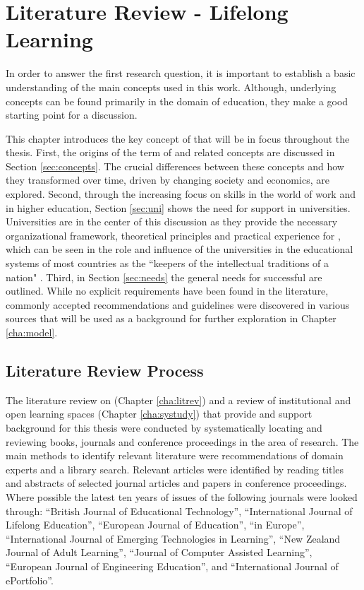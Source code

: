 \chapter{Literature Review - Lifelong Learning \label{cha:litrev}}

In order to answer the first research question, it is important to establish a
basic understanding of the main concepts used in this work. Although,
underlying concepts can be found primarily in the domain of education, they make
a good starting point for a discussion. 

This chapter introduces the key concept of \LLLs that will be in focus
throughout the thesis. First, the origins of the term of \textit{\LLLsn} and
related concepts are discussed in Section \ref{sec:concepts}. The crucial
differences between these concepts and how they transformed over time, driven by
changing society and economics, are explored. Second, through the increasing
focus on \LLLs skills in the world of work and in higher education, Section
\ref{sec:uni} shows the need for \LLLs support in universities. Universities are
in the center of this discussion as they provide the necessary organizational
framework, theoretical principles and practical experience for \LLLs
\citep{Knapper2000}, which can be seen in the role and influence of the
universities in the educational systems of most countries as the ``keepers of
the intellectual traditions of a nation" \citep[p.~96]{Longworth2003}. Third, in
Section \ref{sec:needs} the general needs for successful \LLLs are outlined.
While no explicit requirements have been found in the literature, commonly
accepted recommendations and guidelines were discovered in various sources that
will be used as a background for further exploration in Chapter \ref{cha:model}.

\section{Literature Review Process}
The literature review on \LLLs (Chapter \ref{cha:litrev}) and a review of
institutional and open learning spaces (Chapter \ref{cha:systudy}) that provide
and support background for this thesis were conducted by systematically locating
and reviewing books, journals and conference proceedings in the area of
research. The main methods to identify relevant literature were recommendations
of domain experts and a library search. Relevant articles were identified by
reading titles and abstracts of selected journal articles and papers in
conference proceedings. Where possible the latest ten years of issues of the
following journals were looked through: ``British Journal of Educational
Technology'', ``International Journal of Lifelong Education'', ``European
Journal of Education'', ``\LLLc in Europe'', ``International Journal of Emerging
Technologies in Learning'', ``New Zealand Journal of Adult Learning'', ``Journal
of Computer Assisted Learning'', ``European Journal of Engineering Education'',
and ``International Journal of ePortfolio''. 

